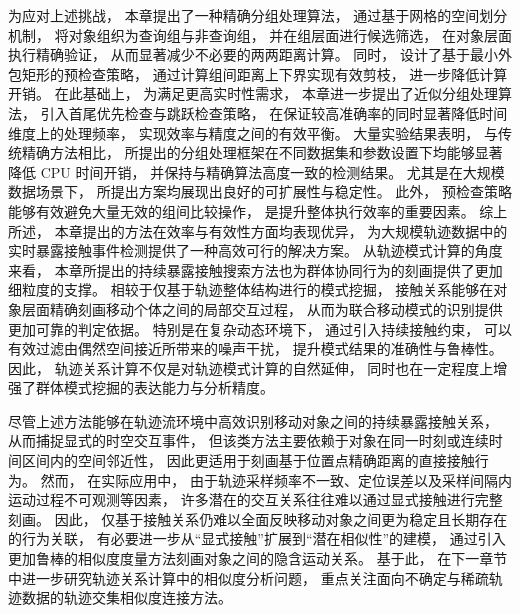 为应对上述挑战， 本章提出了一种精确分组处理算法， 通过基于网格的空间划分机制， 将对象组织为查询组与非查询组， 并在组层面进行候选筛选， 在对象层面执行精确验证， 从而显著减少不必要的两两距离计算。 同时， 设计了基于最小外包矩形的预检查策略， 通过计算组间距离上下界实现有效剪枝， 进一步降低计算开销。 在此基础上， 为满足更高实时性需求， 本章进一步提出了近似分组处理算法， 引入首尾优先检查与跳跃检查策略， 在保证较高准确率的同时显著降低时间维度上的处理频率， 实现效率与精度之间的有效平衡。 大量实验结果表明， 与传统精确方法相比， 所提出的分组处理框架在不同数据集和参数设置下均能够显著降低 CPU 时间开销， 并保持与精确算法高度一致的检测结果。 尤其是在大规模数据场景下， 所提出方案均展现出良好的可扩展性与稳定性。 此外， 预检查策略能够有效避免大量无效的组间比较操作， 是提升整体执行效率的重要因素。 综上所述， 本章提出的方法在效率与有效性方面均表现优异， 为大规模轨迹数据中的实时暴露接触事件检测提供了一种高效可行的解决方案。 从轨迹模式计算的角度来看， 本章所提出的持续暴露接触搜索方法也为群体协同行为的刻画提供了更加细粒度的支撑。 相较于仅基于轨迹整体结构进行的模式挖掘， 接触关系能够在对象层面精确刻画移动个体之间的局部交互过程， 从而为联合移动模式的识别提供更加可靠的判定依据。 特别是在复杂动态环境下， 通过引入持续接触约束， 可以有效过滤由偶然空间接近所带来的噪声干扰， 提升模式结果的准确性与鲁棒性。 因此， 轨迹关系计算不仅是对轨迹模式计算的自然延伸， 同时也在一定程度上增强了群体模式挖掘的表达能力与分析精度。

尽管上述方法能够在轨迹流环境中高效识别移动对象之间的持续暴露接触关系， 从而捕捉显式的时空交互事件， 但该类方法主要依赖于对象在同一时刻或连续时间区间内的空间邻近性， 因此更适用于刻画基于位置点精确距离的直接接触行为。 然而， 在实际应用中， 由于轨迹采样频率不一致、定位误差以及采样间隔内运动过程不可观测等因素， 许多潜在的交互关系往往难以通过显式接触进行完整刻画。
因此， 仅基于接触关系仍难以全面反映移动对象之间更为稳定且长期存在的行为关联， 有必要进一步从“显式接触”扩展到“潜在相似性”的建模， 通过引入更加鲁棒的相似度度量方法刻画对象之间的隐含运动关系。 基于此， 在下一章节中进一步研究轨迹关系计算中的相似度分析问题， 重点关注面向不确定与稀疏轨迹数据的轨迹交集相似度连接方法。
